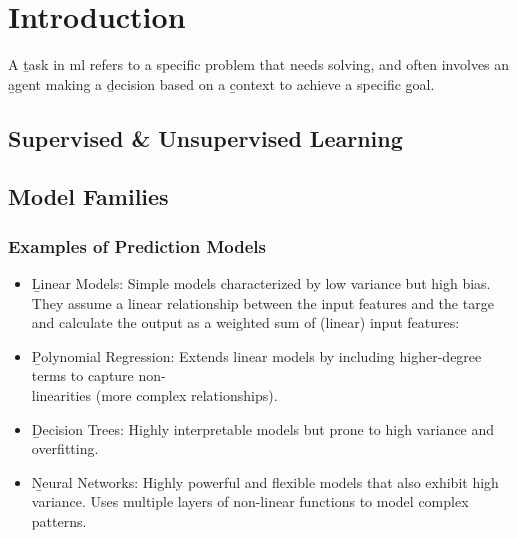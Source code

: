 \section{Introduction}
A \b{task} in \ac{ml} refers to a specific problem that needs solving, and often involves an \b{agent} making a \b{decision} based on a \b{context} to achieve a specific \b{goal}.

\subsection{Supervised \& Unsupervised Learning}

\subsection{Model Families}



\subsubsection{Examples of Prediction Models}
\begin{itemize}
\item \b{Linear Models}: Simple models characterized by low variance but high bias. They assume a linear relationship between the input features and the targe and calculate the output as a weighted sum of (linear) input features:
\item \b{Polynomial Regression}: Extends linear models by including higher-degree terms to capture non-\\linearities (more complex relationships).
\item \b{Decision Trees}: Highly interpretable models but prone to high variance and overfitting.
\item \b{Neural Networks}: Highly powerful and flexible models that also exhibit high variance. Uses multiple layers of non-linear functions to model complex patterns.
\end{itemize}


